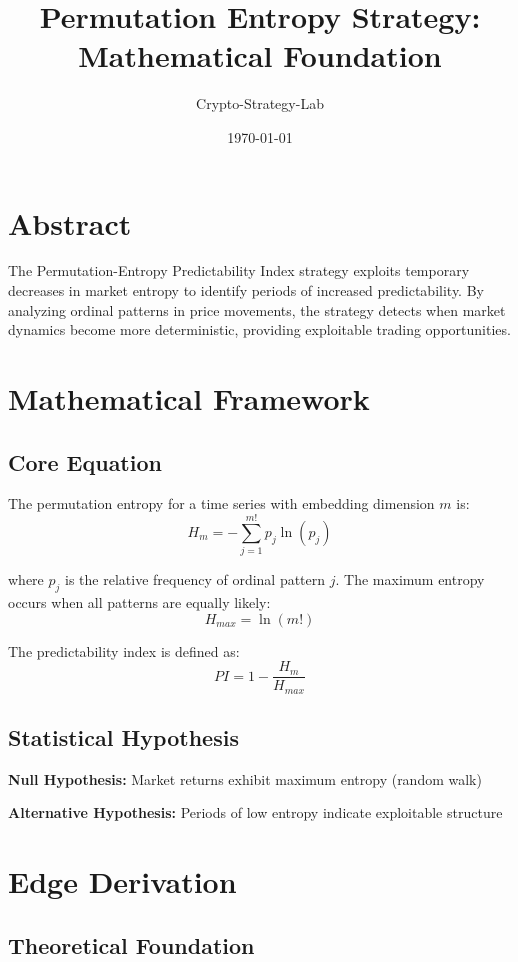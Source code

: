 \documentclass{article}
\title{Permutation Entropy Strategy: Mathematical Foundation}
\author{Crypto-Strategy-Lab}
\date{\today}
\begin{document}
\maketitle

\section{Abstract}

The Permutation-Entropy Predictability Index strategy exploits temporary decreases in market entropy to identify periods of increased predictability. By analyzing ordinal patterns in price movements, the strategy detects when market dynamics become more deterministic, providing exploitable trading opportunities.

\section{Mathematical Framework}

\subsection{Core Equation}

The permutation entropy for a time series with embedding dimension $m$ is:
$$H_m = -\sum_{j=1}^{m!} p_j \ln(p_j)$$

where $p_j$ is the relative frequency of ordinal pattern $j$. The maximum entropy occurs when all patterns are equally likely:
$$H_{max} = \ln(m!)$$

The predictability index is defined as:
$$PI = 1 - \frac{H_m}{H_{max}}$$

\subsection{Statistical Hypothesis}

\textbf{Null Hypothesis:} Market returns exhibit maximum entropy (random walk)

\textbf{Alternative Hypothesis:} Periods of low entropy indicate exploitable structure

\section{Edge Derivation}

\subsection{Theoretical Foundation}
\end{document}
